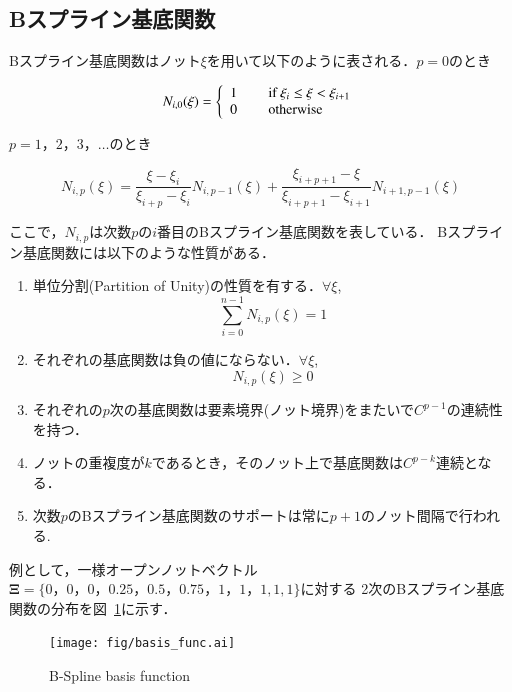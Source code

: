 \subsection{Bスプライン基底関数}
Bスプライン基底関数はノット$\xi$を用いて以下のように表される．$p = 0$のとき

\begin{equation}
  N_{i,0}(\xi)= \left \{
  \begin{array}{l}
    1    \ \qquad $if$\  \xi_{i} \leq \xi < \xi_{i + 1} \\
    0    \ \qquad $otherwise$
  \end{array}
  \right.
  \label{eq:basis func 0}
\end{equation}

\noindent
$p = 1，2，3，\dots$のとき

\begin{equation}
  N_{i,p}(\xi)=
  \frac{\xi-\xi_i}{\xi_{i+p}-\xi_i}N_{i,p-1}(\xi)
  +\frac{\xi_{i+p+1}-\xi}{\xi_{i+p+1}-\xi_{i+1}}N_{i+1,p-1}(\xi)
  \label{eq:basis func 1}
\end{equation}

\noindent
ここで，$N_{i,p}$は次数$p$の$i$番目のBスプライン基底関数を表している．
Bスプライン基底関数には以下のような性質がある．

\begin{enumerate}
  \item 単位分割(Partition of Unity)の性質を有する．$\forall \xi$,
    \begin{equation}
      \sum_{i = 0}^{n - 1} N_{i, p}(\xi) = 1
    \end{equation}
  \item それぞれの基底関数は負の値にならない．$\forall \xi$,
    \begin{equation}
      N_{i,p}(\xi) \geq 0
    \end{equation}
  \item それぞれの$p$次の基底関数は要素境界(ノット境界)をまたいで$C^{p-1}$の連続性を持つ．
  \item ノットの重複度が$k$であるとき，そのノット上で基底関数は$C^{p-k}$連続となる．
  \item 次数$p$のBスプライン基底関数のサポートは常に$p+1$のノット間隔で行われる.
\end{enumerate}

例として，一様オープンノットベクトル$\boldsymbol{\Xi}=\{0，0，0，0.25，0.5，0.75，1，1，1, 1, 1\}$に対する
2次のBスプライン基底関数の分布を図~\ref{fig:basis func}に示す．

\begin{figure}[htbp]
  \centering
  \texttt{[image: fig/basis\_func.ai]}
  \caption{B-Spline basis function}
  \label{fig:basis func}
\end{figure}

